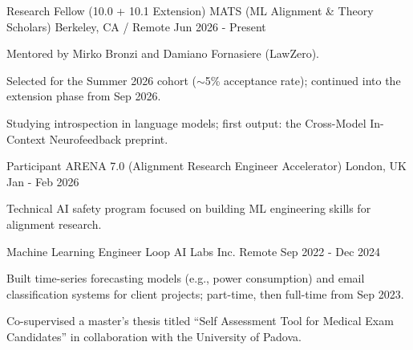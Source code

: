 

\begin{cventries}

  \cventry
    {Research Fellow (10.0 + 10.1 Extension)} %
    {MATS (ML Alignment \& Theory Scholars)} %
    {Berkeley, CA / Remote} %
    {Jun 2026 - Present} %
    {
      \begin{cvitems} %
        \item {Mentored by Mirko Bronzi and Damiano Fornasiere (LawZero).}
        \item {Selected for the Summer 2026 cohort ($\sim$5\% acceptance rate); continued into the extension phase from Sep 2026.}
        \item {Studying introspection in language models; first output: the Cross-Model In-Context Neurofeedback preprint.}
      \end{cvitems}
    }

  \cventry
    {Participant} %
    {ARENA 7.0 (Alignment Research Engineer Accelerator)} %
    {London, UK} %
    {Jan - Feb 2026} %
    {
      \begin{cvitems} %
        \item {Technical AI safety program focused on building ML engineering skills for alignment research.}
      \end{cvitems}
    }

  \cventry
    {Machine Learning Engineer} %
    {Loop AI Labs Inc.} %
    {Remote} %
    {Sep 2022 - Dec 2024} %
    {
      \begin{cvitems} %
        \item {Built time-series forecasting models (e.g., power consumption) and email classification systems for client projects; part-time, then full-time from Sep 2023.}
        \item {Co-supervised a master's thesis titled ``Self Assessment Tool for Medical Exam Candidates'' in collaboration with the University of Padova.}
      \end{cvitems}
    }


\end{cventries}

